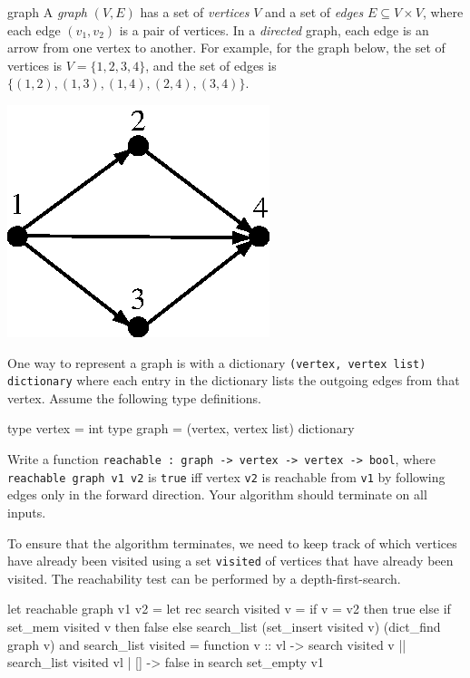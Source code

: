 %
\begin{exercise}{graph}
A \emph{graph} $(V, E)$ has a set of \emph{vertices} $V$ and a set of \emph{edges} $E \subseteq
V \times V$, where each edge $(v_1, v_2)$ is a pair of vertices.  In a \emph{directed} graph, each
edge is an arrow from one vertex to another.  For example, for the graph below, the set of vertices
is $V = \{ 1, 2, 3, 4 \}$, and the set of edges is $\{ (1, 2), (1, 3), (1, 4), (2, 4), (3, 4) \}$.

\begin{center}
\includegraphics[scale=0.5]{graph1}
\end{center}
%
One way to represent a graph is with a dictionary \hbox{\lstinline/(vertex, vertex list) dictionary/} where
each entry in the dictionary lists the outgoing edges from that vertex.
Assume the following type definitions.

\begin{ocaml}
type vertex = int
type graph = (vertex, vertex list) dictionary
\end{ocaml}
%
Write a function \hbox{\lstinline/reachable : graph -> vertex -> vertex -> bool/}, where
\hbox{\lstinline/reachable graph v1 v2/} is \hbox{\lstinline/true/} iff vertex \hbox{\lstinline/v2/} is
reachable from \hbox{\lstinline/v1/} by following edges only in the forward direction.  Your algorithm should
terminate on all inputs.

\begin{answer}\ifanswers
To ensure that the algorithm terminates, we need to keep track of which vertices have already been
visited using a set \hbox{\lstinline/visited/} of vertices that have already been visited.  The
reachability test can be performed by a depth-first-search.

\begin{ocaml}
let reachable graph v1 v2 =
   let rec search visited v =
      if v = v2 then
         true
      else if set_mem visited v then
         false
      else
         search_list (set_insert visited v) (dict_find graph v)
   and search_list visited = function
      v :: vl -> search visited v || search_list visited vl
    | [] -> false
   in
      search set_empty v1
\end{ocaml}
\fi\end{answer}
\end{exercise}

